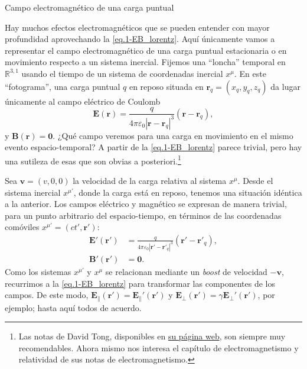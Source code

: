 \begin{example}
    {Campo electromagnético de una carga puntual}
    \label{ex.1-campo_em_carga}

    Hay muchos efectos electromagnéticos que se pueden entender con mayor profundidad aprovechando la \cref{eq.1-EB_lorentz}. Aquí únicamente vamos a representar el campo electromagnético de una carga puntual estacionaria o en movimiento respecto a un sistema inercial. Fijemos una ``loncha'' temporal en \(\mathbb{R}^{3, 1}\) usando el tiempo de un sistema de coordenadas inercial \(x^{\mu}\). En este ``fotograma'', una carga puntual \(q\) en reposo situada en \(\mathbf{r}_q = (x_q, y_q, z_q)\) da lugar únicamente al campo eléctrico de Coulomb
    \begin{equation}
        \mathbf{E}(\mathbf{r}) = \frac{q}{4\pi\varepsilon_0 |\mathbf{r}-\mathbf{r}_q|^3} (\mathbf{r}-\mathbf{r}_q),
    \end{equation}
    y \(\mathbf{B}(\mathbf{r})=\mathbf{0}\). ¿Qué campo veremos para una carga en movimiento en el mismo evento espacio-temporal? A partir de la \cref{eq.1-EB_lorentz} parece trivial, pero hay una sutileza de esas que son obvias a posteriori.\footnote{Las notas de David Tong, disponibles en \href{https://davidtong.org/teaching/}{su página web}, son siempre muy recomendables. Ahora mismo nos interesa el capítulo de electromagnetismo y relatividad de sus notas de electromagnetismo.}

    Sea \(\mathbf{v}=(v, 0, 0)\) la velocidad de la carga relativa al sistema \(x^{\mu}\). Desde el sistema inercial \(x^{\mu'}\), donde la carga está en reposo, tenemos una situación idéntica a la anterior. Los campos eléctrico y magnético se expresan de manera trivial, para un punto arbitrario del espacio-tiempo, en términos de las coordenadas comóviles \(x^{\mu'} = (ct', \mathbf{r}')\):
    \begin{subequations}
        \begin{align}
            \label{eq.1-E_moving}
            \mathbf{E}'(\mathbf{r}') &= \frac{q}{4\pi\varepsilon_0 |\mathbf{r}'-\mathbf{r}'_q|^3} (\mathbf{r}'-\mathbf{r}'_q),\\
            \mathbf{B}'(\mathbf{r}') &= \mathbf{0}.
        \end{align}
    \end{subequations}
    Como los sistemas \(x^{\mu'}\) y \(x^{\mu}\) se relacionan mediante un \textit{boost} de velocidad \(-\mathbf{v}\), recurrimos a la \cref{eq.1-EB_lorentz} para transformar las componentes de los campos. De este modo, \(\mathbf{E}_\parallel(\mathbf{r}') = \mathbf{E}_\parallel'(\mathbf{r}')\) y \(\mathbf{E}_\perp(\mathbf{r}') = \gamma\mathbf{E}_\perp'(\mathbf{r}')\), por ejemplo; hasta aquí todos de acuerdo.
    

\end{example}
